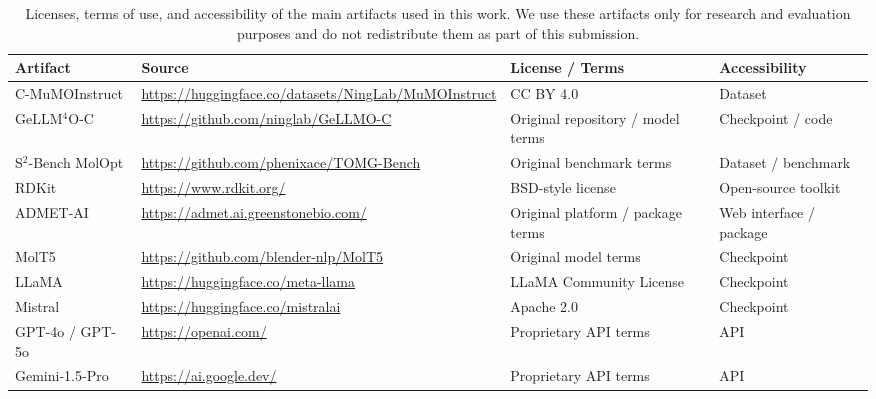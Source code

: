 \documentclass[11pt]{article}
\begin{document}
\begin{table}[!htp]
\centering
\small
\setlength{\tabcolsep}{4pt}
\renewcommand{\arraystretch}{1.03}
\begin{tabularx}{\textwidth}{@{}p{} X p{} p{}@{}}
\toprule
\textbf{Artifact} & \textbf{Source} & \textbf{License / Terms} & \textbf{Accessibility} \\
\midrule

C-MuMOInstruct
& \url{https://huggingface.co/datasets/NingLab/MuMOInstruct}
& CC BY 4.0
& Dataset \\

GeLLM$^4$O-C
& \url{https://github.com/ninglab/GeLLMO-C}
& Original repository / model terms
& Checkpoint / code \\

S$^2$-Bench MolOpt
& \url{https://github.com/phenixace/TOMG-Bench}
& Original benchmark terms
& Dataset / benchmark \\

RDKit
& \url{https://www.rdkit.org/}
& BSD-style license
& Open-source toolkit \\

ADMET-AI
& \url{https://admet.ai.greenstonebio.com/}
& Original platform / package terms
& Web interface / package \\

MolT5
& \url{https://github.com/blender-nlp/MolT5}
& Original model terms
& Checkpoint \\

LLaMA
& \url{https://huggingface.co/meta-llama}
& LLaMA Community License
& Checkpoint \\

Mistral
& \url{https://huggingface.co/mistralai}
& Apache 2.0
& Checkpoint \\

GPT-4o / GPT-5o
& \url{https://openai.com/}
& Proprietary API terms
& API \\

Gemini-1.5-Pro
& \url{https://ai.google.dev/}
& Proprietary API terms
& API \\

\bottomrule
\end{tabularx}
\caption{Licenses, terms of use, and accessibility of the main artifacts used in this work. We use these artifacts only for research and evaluation purposes and do not redistribute them as part of this submission.}
\label{tab:artifact_licenses}
\end{table}
\end{document}
